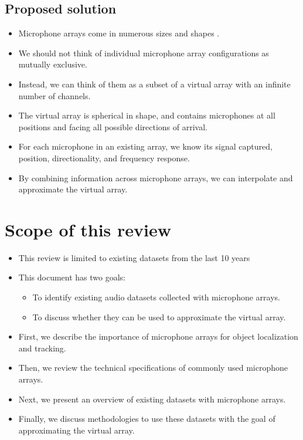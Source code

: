 \documentclass[14pt, legalpaper]{extarticle}
\begin{document}
\subsection{Proposed solution}

\begin{itemize}

\item Microphone arrays come in numerous sizes and shapes \cite{kurz2015comparison, bates2017comparing, lopez2019sphear}. 

\item We should not think of individual microphone array configurations as mutually exclusive.

\item Instead, we can think of them as a subset of a virtual array with an infinite number of channels.

\item The virtual array is spherical in shape, and contains microphones at all positions and facing all possible directions of arrival.

\item For each microphone in an existing array, we know its signal captured, position, directionality, and frequency response. 

\item By combining information across microphone arrays, we can interpolate and approximate the virtual array.

\end{itemize}

\section{Scope of this review}

\begin{itemize}

\item This review is limited to existing datasets from the last 10 years

\item This document has two goals:
	\begin{itemize}
	\item To identify existing audio datasets collected with microphone arrays. 
	\item To discuss whether they can be used to approximate the virtual array. 
	\end{itemize}

\item First, we describe the importance of microphone arrays for object localization and tracking.

\item Then, we review the technical specifications of commonly used microphone arrays.

\item Next, we present an overview of existing datasets with microphone arrays.

\item Finally, we discuss methodologies to use these datasets with the goal of approximating the virtual array.  

\end{itemize}
\end{document}
